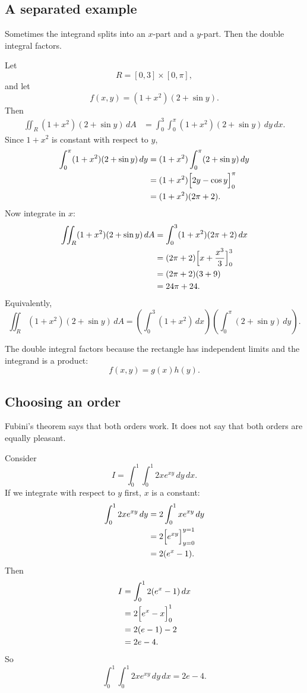 \subsection{A separated example}

Sometimes the integrand splits into an \(x\)-part and a \(y\)-part.  Then the double
integral factors.

Let
\[
    R=[0,3]\times[0,\pi],
\]
and let
\[
    f(x,y)=(1+x^2)(2+\sin y).
\]
Then
\[
\begin{aligned}
    \iint_R (1+x^2)(2+\sin y)\,dA
    &=
    \int_0^3\int_0^\pi (1+x^2)(2+\sin y)\,dy\,dx.
\end{aligned}
\]
Since \(1+x^2\) is constant with respect to \(y\),
\[
\begin{aligned}
    \int_0^\pi (1+x^2)(2+\sin y)\,dy
    &=
    (1+x^2)\int_0^\pi (2+\sin y)\,dy    \\
    &=
    (1+x^2)\Bigl[2y-\cos y\Bigr]_0^\pi \\
    &=
    (1+x^2)(2\pi+2).
\end{aligned}
\]
Now integrate in \(x\):
\[
\begin{aligned}
    \iint_R (1+x^2)(2+\sin y)\,dA
    &=
    \int_0^3 (1+x^2)(2\pi+2)\,dx\\
    &=
    (2\pi+2)\Bigl[x+\frac{x^3}{3}\Bigr]_0^3\\
    &=
    (2\pi+2)(3+9)\\
    &=
    24\pi+24.
\end{aligned}
\]
Equivalently,
\[
\boxed{
    \iint_R (1+x^2)(2+\sin y)\,dA
    =
    \left(\int_0^3 (1+x^2)\,dx\right)
    \left(\int_0^\pi (2+\sin y)\,dy\right).
}
\]

The double integral factors because the rectangle has independent limits and the
integrand is a product:
\[
    f(x,y)=g(x)h(y).
\]

\subsection{Choosing an order}

Fubini's theorem says that both orders work.  It does not say that both orders are equally
pleasant.

Consider
\[
    I=
    \int_0^1\int_0^1 2x e^{xy}\,dy\,dx.
\]
If we integrate with respect to \(y\) first, \(x\) is a constant:
\[
\begin{aligned}
    \int_0^1 2x e^{xy}\,dy
    &=
    2\int_0^1 x e^{xy}\,dy\\
    &=
    2\Bigl[e^{xy}\Bigr]_{y=0}^{y=1}\\
    &=
    2(e^x-1).
\end{aligned}
\]
Then
\[
\begin{aligned}
    I
    &=
    \int_0^1 2(e^x-1)\,dx\\
    &=
    2\Bigl[e^x-x\Bigr]_0^1\\
    &=
    2(e-1)-2\\
    &=
    2e-4.
\end{aligned}
\]
So
\[
\boxed{
    \int_0^1\int_0^1 2x e^{xy}\,dy\,dx=2e-4.
}
\]

